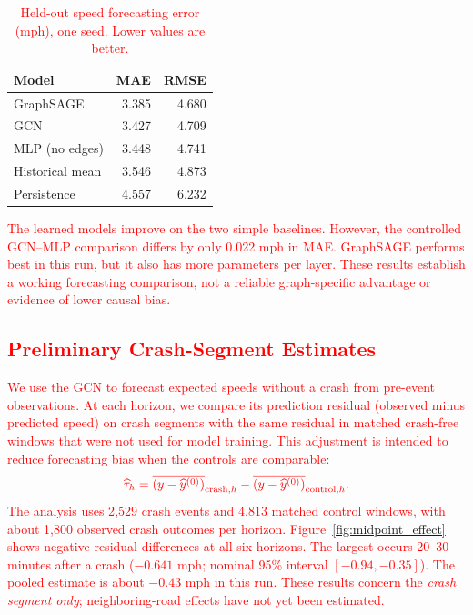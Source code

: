 \documentclass[sigconf,nonacm]{acmart}
\begin{document}
\begin{table}[t]
\centering
\caption{\textcolor{red}{Held-out speed forecasting error (mph),
one seed. Lower values are better.}}
\label{tab:midpoint_models}
\footnotesize
{\color{red}
\begin{tabular}{lrr}
\toprule
Model & MAE & RMSE \\
\midrule
GraphSAGE & 3.385 & 4.680 \\
GCN & 3.427 & 4.709 \\
MLP (no edges) & 3.448 & 4.741 \\
Historical mean & 3.546 & 4.873 \\
Persistence & 4.557 & 6.232 \\
\bottomrule
\end{tabular}}
\end{table}

\textcolor{red}{The learned models improve on the two simple
baselines. However, the controlled GCN--MLP comparison differs by
only 0.022 mph in MAE. GraphSAGE performs best in this run, but it
also has more parameters per layer. These results establish a working
forecasting comparison, not a reliable graph-specific advantage or
evidence of lower causal bias.}

\subsection{\textcolor{red}{Preliminary Crash-Segment Estimates}}
\textcolor{red}{We use the GCN to forecast expected speeds without a
crash from pre-event observations. At each horizon, we compare its
prediction residual (observed minus predicted speed) on crash segments
with the same residual in matched crash-free windows that were not used
for model training. This adjustment is intended to reduce forecasting
bias when the controls are comparable:}
\begin{equation}
\color{red}
\widehat{\tau}_h =
\overline{(y-\widehat y^{(0)})}_{\mathrm{crash},h}
-\overline{(y-\widehat y^{(0)})}_{\mathrm{control},h}.
\end{equation}
\textcolor{red}{The analysis uses 2{,}529 crash events and 4{,}813
matched control windows, with about 1{,}800 observed crash outcomes
per horizon. Figure~\ref{fig:midpoint_effect} shows negative residual
differences at all six horizons. The largest occurs 20--30 minutes
after a crash ($-0.641$ mph; nominal 95\% interval $[-0.94,-0.35]$).
The pooled estimate is about $-0.43$ mph in this run. These results
concern the \emph{crash segment only}; neighboring-road effects have
not yet been estimated.}
\end{document}
